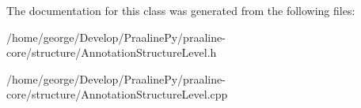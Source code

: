 The documentation for this class was generated from the following files\+:\begin{DoxyCompactItemize}
\item 
/home/george/\+Develop/\+Praaline\+Py/praaline-\/core/structure/Annotation\+Structure\+Level.\+h\item 
/home/george/\+Develop/\+Praaline\+Py/praaline-\/core/structure/Annotation\+Structure\+Level.\+cpp\end{DoxyCompactItemize}
